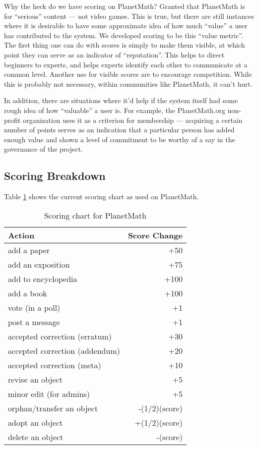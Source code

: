 Why the heck do we have scoring on PlanetMath? Granted that PlanetMath is for ``serious'' content --- not video games. This is true, but there are still instances where it is desirable to have some approximate idea of how much
``value'' a user has contributed to the system. We developed scoring to be this ``value metric''. The first thing one can do with scores is simply to make them visible, at which point they can serve as an indicator of ``reputation''. This helps to direct beginners to experts, and helps experts identify each other to communicate at a common level. Another use for visible scores are to encourage competition. While this is probably not necessary, within communities like PlanetMath, it can't hurt.

In addition, there are situations where it'd help if the system itself had some rough idea of how ``valuable'' a user is. For example, the PlanetMath.org non-profit organization uses it as a criterion for membership --- acquiring a certain number of points serves as an indication that a particular person has added enough value and shown a level of commitment to be worthy of a say in the governance of the project.  

\subsection*{Scoring Breakdown}

Table \ref{tab:scoring} shows the current scoring chart as used on PlanetMath.

\begin{table}[h]
\caption{Scoring chart for PlanetMath}\label{tab:scoring}
\begin{center}
\begin{tabular}{|l|r|}
\hline
Action&Score Change\\
\hline
add a paper &+50 \\
\hline
add an exposition &+75 \\
\hline
add to encyclopedia &+100 \\
\hline
add a book &+100 \\
\hline
vote (in a poll) &+1 \\
\hline
post a message &+1 \\
\hline
accepted correction (erratum) &+30 \\
\hline
accepted correction (addendum) &+20 \\
\hline
accepted correction (meta) &+10 \\
\hline
revise an object &+5 \\
\hline
minor edit (for admins) &+5 \\
\hline
orphan/transfer an object &-(1/2)(score) \\
\hline
adopt an object &+(1/2)(score) \\
\hline
delete an object &-(score) \\
\hline
\end{tabular}
\end{center}
\end{table}

